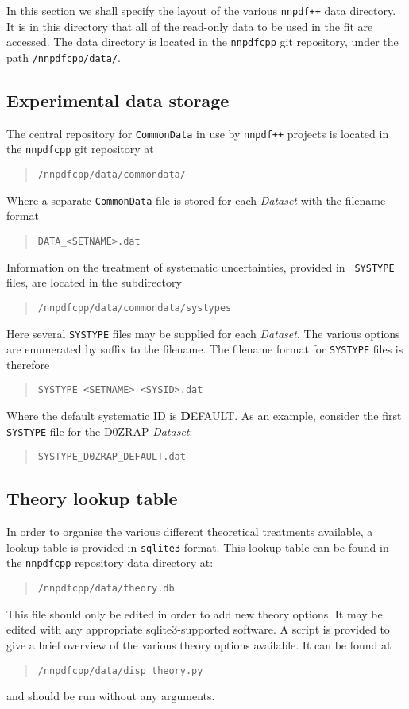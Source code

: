 \documentclass[11pt]{article}
\begin{document}
In this section we shall specify the layout of the various {\tt nnpdf++} data
directory. It is in this directory that all of the read-only data to be used in
the fit are accessed. The data directory is located in the {\tt nnpdfcpp} git
repository, under the path {\tt /nnpdfcpp/data/}.

\subsection{Experimental data storage}
The central repository for {\tt CommonData} in use by {\tt nnpdf++} projects is
located in the {\tt nnpdfcpp} git repository at
%
\begin{quotation}
    {\tt /nnpdfcpp/data/commondata/}
\end{quotation}
%
Where a separate {\tt CommonData} file is stored for each {\it Dataset} with the
filename format
%
\begin{quotation}
	{\tt DATA\_<SETNAME>.dat }
\end{quotation}
%
Information on the treatment of systematic uncertainties, provided in {\tt
SYSTYPE} files, are located in the subdirectory
%
\begin{quotation}
    {\tt /nnpdfcpp/data/commondata/systypes}
\end{quotation}
%
Here several {\tt SYSTYPE} files may be supplied for each {\it Dataset}. The
various options are enumerated by suffix to the filename. The filename format
for {\tt SYSTYPE} files is therefore
%
\begin{quotation}
	{\tt SYSTYPE\_<SETNAME>\_<SYSID>.dat }
\end{quotation}
%
Where the default systematic ID is {\textbf DEFAULT}. As an example, consider
the first {\tt SYSTYPE} file for the D0ZRAP {\it Dataset}:
%
\begin{quotation}
	{\tt SYSTYPE\_D0ZRAP\_DEFAULT.dat }
\end{quotation}

\subsection{Theory lookup table}
In order to organise the various different theoretical treatments available, a
lookup table is provided in {\tt sqlite3} format. This lookup table can be found
in the {\tt nnpdfcpp} repository data directory at:
%
\begin{quotation}
    {\tt /nnpdfcpp/data/theory.db}
\end{quotation}
%
This file should only be edited in order to add new theory options. It may be
edited with any appropriate sqlite3-supported software. A script is provided to
give a brief overview of the various theory options available. It can be found
at
%
\begin{quotation}
    {\tt /nnpdfcpp/data/disp\_theory.py}
\end{quotation}
%
and should be run without any arguments.
\end{document}
